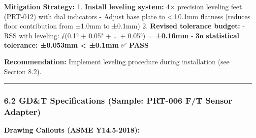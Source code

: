 \documentclass[
]{article}
\begin{document}
\textbf{Mitigation Strategy:} 1. \textbf{Install leveling system:} 4×
precision leveling feet (PRT-012) with dial indicators - Adjust base
plate to \textless±0.1mm flatness (reduces floor contribution from
±1.0mm to ±0.1mm) 2. \textbf{Revised tolerance budget:} - RSS with
leveling: √(0.1² + 0.05² + \ldots{} + 0.05²) = \textbf{±0.16mm} -
\textbf{3σ statistical tolerance: ±0.053mm \textless{} ±0.1mm} ✅
\textbf{PASS}

\textbf{Recommendation:} Implement leveling procedure during
installation (see Section 8.2).

\begin{center}\rule{0.5\linewidth}{0.5pt}\end{center}

\hypertarget{gdt-specifications-sample-prt-006-ft-sensor-adapter}{%
\subsubsection{6.2 GD\&T Specifications (Sample: PRT-006 F/T Sensor
Adapter)}\label{gdt-specifications-sample-prt-006-ft-sensor-adapter}}

\textbf{Drawing Callouts (ASME Y14.5-2018):}
\end{document}
